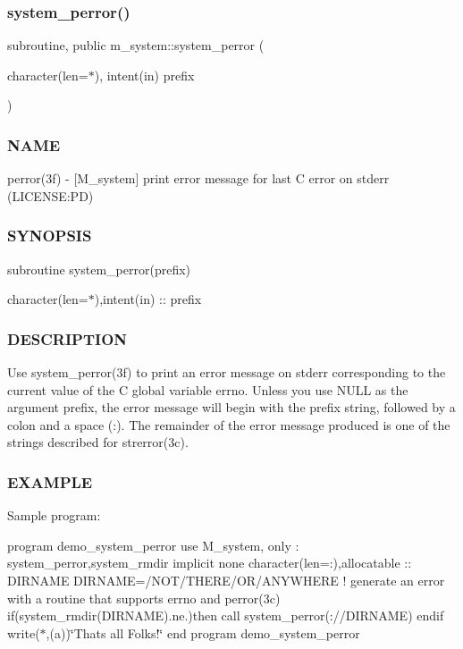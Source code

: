 \subsubsection{\texorpdfstring{system\+\_\+perror()}{system\_perror()}}
{\footnotesize\ttfamily subroutine, public m\+\_\+system\+::system\+\_\+perror (\begin{DoxyParamCaption}\item[{character(len=$\ast$), intent(in)}]{prefix }\end{DoxyParamCaption})}



\subsubsection*{N\+A\+ME}

perror(3f) -\/ \mbox{[}M\+\_\+system\mbox{]} print error message for last C error on stderr (L\+I\+C\+E\+N\+SE\+:PD) \subsubsection*{S\+Y\+N\+O\+P\+S\+IS}

subroutine system\+\_\+perror(prefix)

character(len=$\ast$),intent(in) \+:\+: prefix

\subsubsection*{D\+E\+S\+C\+R\+I\+P\+T\+I\+ON}

Use system\+\_\+perror(3f) to print an error message on stderr corresponding to the current value of the C global variable errno. Unless you use N\+U\+LL as the argument prefix, the error message will begin with the prefix string, followed by a colon and a space (\+:). The remainder of the error message produced is one of the strings described for strerror(3c).

\subsubsection*{E\+X\+A\+M\+P\+LE}

Sample program\+:

program demo\+\_\+system\+\_\+perror use M\+\_\+system, only \+: system\+\_\+perror,system\+\_\+rmdir implicit none character(len=\+:),allocatable \+:\+: D\+I\+R\+N\+A\+ME D\+I\+R\+N\+A\+ME=\textquotesingle{}/\+N\+O\+T/\+T\+H\+E\+R\+E/\+O\+R/\+A\+N\+Y\+W\+H\+E\+RE\textquotesingle{} ! generate an error with a routine that supports errno and perror(3c) if(system\+\_\+rmdir(\+D\+I\+R\+N\+A\+M\+E).ne.)then call system\+\_\+perror(\+:\textquotesingle{}//\+D\+I\+R\+N\+A\+ME) endif write($\ast$,\textquotesingle{}(a)\textquotesingle{})\char`\"{}\+That\textquotesingle{}s all Folks!\char`\"{} end program demo\+\_\+system\+\_\+perror

